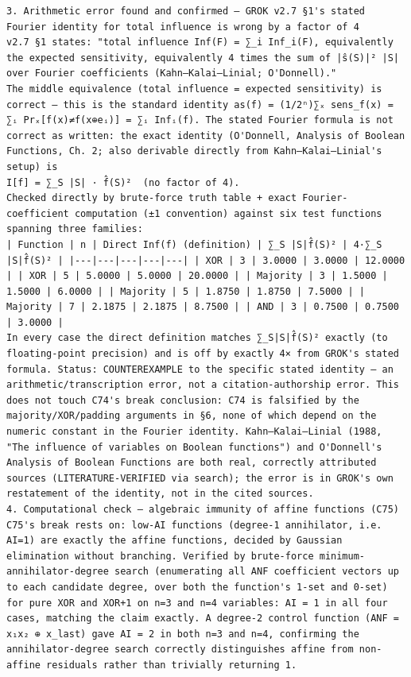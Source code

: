 \documentclass[11pt]{article}
\begin{document}
\begin{Verbatim}[breaklines=true,breakanywhere=true]
3. Arithmetic error found and confirmed — GROK v2.7 §1's stated Fourier identity for total influence is wrong by a factor of 4
v2.7 §1 states: "total influence Inf(F) = ∑_i Inf_i(F), equivalently the expected sensitivity, equivalently 4 times the sum of |ŝ(S)|² |S| over Fourier coefficients (Kahn–Kalai–Linial; O'Donnell)."
The middle equivalence (total influence = expected sensitivity) is correct — this is the standard identity as(f) = (1/2ⁿ)∑ₓ sens_f(x) = ∑ᵢ Prₓ[f(x)≠f(x⊕eᵢ)] = ∑ᵢ Infᵢ(f). The stated Fourier formula is not correct as written: the exact identity (O'Donnell, Analysis of Boolean Functions, Ch. 2; also derivable directly from Kahn–Kalai–Linial's setup) is
I[f] = ∑_S |S| · f̂(S)²  (no factor of 4).
Checked directly by brute-force truth table + exact Fourier-coefficient computation (±1 convention) against six test functions spanning three families:
| Function | n | Direct Inf(f) (definition) | ∑_S |S|f̂(S)² | 4·∑_S |S|f̂(S)² | |---|---|---|---|---| | XOR | 3 | 3.0000 | 3.0000 | 12.0000 | | XOR | 5 | 5.0000 | 5.0000 | 20.0000 | | Majority | 3 | 1.5000 | 1.5000 | 6.0000 | | Majority | 5 | 1.8750 | 1.8750 | 7.5000 | | Majority | 7 | 2.1875 | 2.1875 | 8.7500 | | AND | 3 | 0.7500 | 0.7500 | 3.0000 |
In every case the direct definition matches ∑_S|S|f̂(S)² exactly (to floating-point precision) and is off by exactly 4× from GROK's stated formula. Status: COUNTEREXAMPLE to the specific stated identity — an arithmetic/transcription error, not a citation-authorship error. This does not touch C74's break conclusion: C74 is falsified by the majority/XOR/padding arguments in §6, none of which depend on the numeric constant in the Fourier identity. Kahn–Kalai–Linial (1988, "The influence of variables on Boolean functions") and O'Donnell's Analysis of Boolean Functions are both real, correctly attributed sources (LITERATURE-VERIFIED via search); the error is in GROK's own restatement of the identity, not in the cited sources.
4. Computational check — algebraic immunity of affine functions (C75)
C75's break rests on: low-AI functions (degree-1 annihilator, i.e. AI=1) are exactly the affine functions, decided by Gaussian elimination without branching. Verified by brute-force minimum-annihilator-degree search (enumerating all ANF coefficient vectors up to each candidate degree, over both the function's 1-set and 0-set) for pure XOR and XOR+1 on n=3 and n=4 variables: AI = 1 in all four cases, matching the claim exactly. A degree-2 control function (ANF = x₁x₂ ⊕ x_last) gave AI = 2 in both n=3 and n=4, confirming the annihilator-degree search correctly distinguishes affine from non-affine residuals rather than trivially returning 1.

\end{Verbatim}
\end{document}
